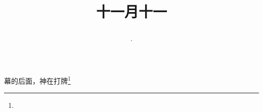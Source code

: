 \title{\date[d=11,m=12,y=2024][year:cn-y,年,month:cn,day:cn,日,·,weekday]·十一月十一 }
幕的后面，神在打牌\footnote{ }

